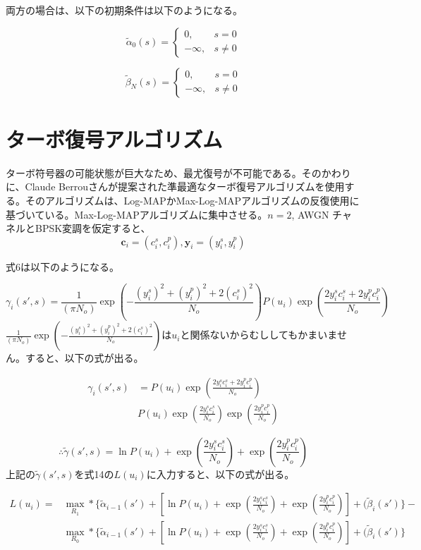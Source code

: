 \documentclass[20 pts]{article}
\begin{document}
両方の場合は、以下の初期条件は以下のようになる。

\[
    \widetilde{\alpha}_0(s)= 
\begin{cases}
   0,& s= 0\\        -\infty,              &  s\neq 0
\end{cases}
\]

\[
   \widetilde{\beta}_N(s)= 
\begin{cases}
   0,& s= 0\\        -\infty,              &  s\neq 0
\end{cases}
\]

\section{ターボ復号アルゴリズム}
ターボ符号器の可能状態が巨大なため、最尤復号が不可能である。そのかわりに、Claude Berrouさんが提案された準最適なターボ復号アルゴリズムを使用する。そのアルゴリズムは、Log-MAPかMax-Log-MAPアルゴリズムの反復使用に基づいている。Max-Log-MAPアルゴリズムに集中させる。$n=2$, AWGN チャネルとBPSK変調を仮定すると、
$$\boldsymbol{c}_i=(c_i^s,c_i^p),  \boldsymbol{y}_i=(y_i^s,y_i^p)$$

式6は以下のようになる。

$$
\gamma_i(s',s)=\frac{1}{(\pi N_o)}\exp(-\frac{(y_i^s)^2+(y_i^p)^2+2(c_i^s)^2}{N_o})P(u_i)\exp(\frac{2y_i^sc_i^s+2y_i^pc_i^p}{N_o})
$$
$\frac{1}{(\pi N_o)}\exp(-\frac{(y_i^s)^2+(y_i^p)^2+2(c_i^s)^2}{N_o})$は$u_i$と関係ないからむししてもかまいません。すると、以下の式が出る。

\begin{equation}
\begin{split}
\gamma_i(s',s)&=P(u_i)\exp(\frac{2y_i^sc_i^s+2y_i^pc_i^p}{N_o})\\
&P(u_i)\exp(\frac{2y_i^sc_i^s}{N_o})\exp(\frac{2y_i^pc_i^p}{N_o})
\end{split}
\end{equation}

$$\therefore\widetilde{\gamma}(s',s)= \ln P(u_i)+\exp(\frac{2y_i^sc_i^s}{N_o})+\exp(\frac{2y_i^pc_i^p}{N_o})$$
上記の$\widetilde{\gamma}(s',s)$を式14の$L(u_i)$に入力すると、以下の式が出る。

\begin{equation}
\begin{split}
L(u_i)=&\max_{R_1}*\Big\{\widetilde{\alpha}_{i-1}(s')+[\ln P(u_i)+\exp(\frac{2y_i^sc_i^s}{N_o})+\exp(\frac{2y_i^pc_i^p}{N_o})]+(\widetilde{\beta}_{i}(s')\Big\}-\\&\max_{R_0}*\Big\{\widetilde{\alpha}_{i-1}(s')+[\ln P(u_i)+\exp(\frac{2y_i^sc_i^s}{N_o})+\exp(\frac{2y_i^pc_i^p}{N_o})]+(\widetilde{\beta}_{i}(s')\Big\}
\end{split}
\end{equation}
\end{document}
